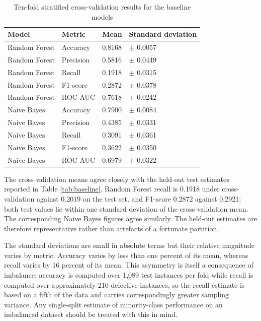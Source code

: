 \documentclass[12pt,a4paper,oneside]{report}
\newcommand{\tabfont}{\fontsize{11}{13}\selectfont\setlength{\tabcolsep}{4pt}}
\begin{document}
\begin{table}[H]
\centering
\caption{Ten-fold stratified cross-validation results for the baseline models}
\label{tab:cv}
\tabfont
\begin{tabular}{L{22mm}L{28mm}C{28mm}C{30mm}}
\toprule
\textbf{Model} & \textbf{Metric} & \textbf{Mean} & \textbf{Standard deviation} \\
\midrule
Random Forest & Accuracy  & 0.8168 & $\pm$ 0.0057 \\
Random Forest & Precision & 0.5816 & $\pm$ 0.0449 \\
Random Forest & Recall    & 0.1918 & $\pm$ 0.0315 \\
Random Forest & F1-score  & 0.2872 & $\pm$ 0.0378 \\
Random Forest & ROC-AUC   & 0.7618 & $\pm$ 0.0242 \\
\midrule
Naive Bayes   & Accuracy  & 0.7900 & $\pm$ 0.0084 \\
Naive Bayes   & Precision & 0.4385 & $\pm$ 0.0331 \\
Naive Bayes   & Recall    & 0.3091 & $\pm$ 0.0361 \\
Naive Bayes   & F1-score  & 0.3622 & $\pm$ 0.0350 \\
Naive Bayes   & ROC-AUC   & 0.6979 & $\pm$ 0.0322 \\
\bottomrule
\end{tabular}
\end{table}

The cross-validation means agree closely with the held-out test estimates reported in Table \ref{tab:baseline}. Random Forest recall is 0.1918 under cross-validation against 0.2019 on the test set, and F1-score 0.2872 against 0.2921; both test values lie within one standard deviation of the cross-validation mean. The corresponding Naive Bayes figures agree similarly. The held-out estimates are therefore representative rather than artefacts of a fortunate partition.

The standard deviations are small in absolute terms but their relative magnitude varies by metric. Accuracy varies by less than one percent of its mean, whereas recall varies by 16 percent of its mean. This asymmetry is itself a consequence of imbalance: accuracy is computed over 1,089 test instances per fold while recall is computed over approximately 210 defective instances, so the recall estimate is based on a fifth of the data and carries correspondingly greater sampling variance. Any single-split estimate of minority-class performance on an imbalanced dataset should be treated with this in mind.
\end{document}

